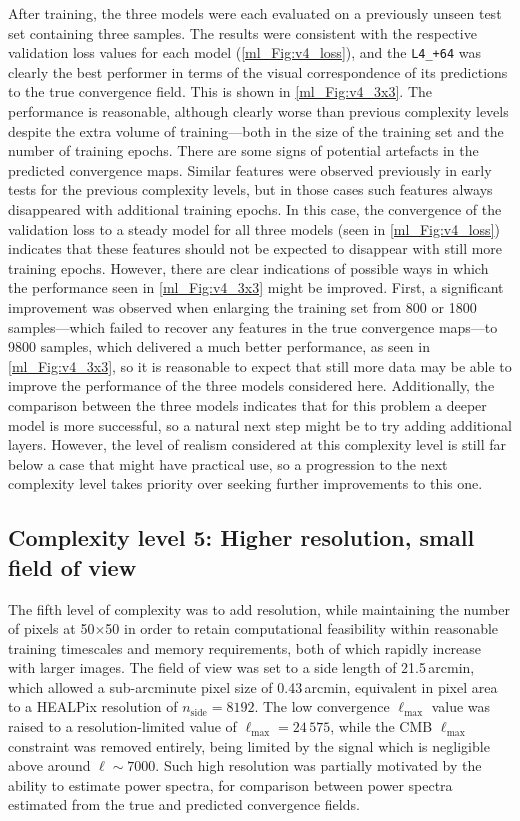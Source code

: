 After training, the three models were each evaluated on a previously unseen test set containing three samples. The results were consistent with the respective validation loss values for each model (\autoref{ml_Fig:v4_loss}), and the \texttt{L4\_+64} was clearly the best performer in terms of the visual correspondence of its predictions to the true convergence field. This is shown in \autoref{ml_Fig:v4_3x3}. The performance is reasonable, although clearly worse than previous complexity levels despite the extra volume of training---both in the size of the training set and the number of training epochs. There are some signs of potential artefacts in the predicted convergence maps. Similar features were observed previously in early tests for the previous complexity levels, but in those cases such features always disappeared with additional training epochs. In this case, the convergence of the validation loss to a steady model for all three models (seen in \autoref{ml_Fig:v4_loss}) indicates that these features should not be expected to disappear with still more training epochs. However, there are clear indications of possible ways in which the performance seen in \autoref{ml_Fig:v4_3x3} might be improved. First, a significant improvement was observed when enlarging the training set from 800 or 1800 samples---which failed to recover any features in the true convergence maps---to 9800 samples, which delivered a much better performance, as seen in \autoref{ml_Fig:v4_3x3}, so it is reasonable to expect that still more data may be able to improve the performance of the three models considered here. Additionally, the comparison between the three models indicates that for this problem a deeper model is more successful, so a natural next step might be to try adding additional layers. However, the level of realism considered at this complexity level is still far below a case that might have practical use, so a progression to the next complexity level takes priority over seeking further improvements to this one.

\subsection{Complexity level 5: Higher resolution, small field of view}
\label{ml_Sec:v5}

The fifth level of complexity was to add resolution, while maintaining the number of pixels at 50$\times$50 in order to retain computational feasibility within reasonable training timescales and memory requirements, both of which rapidly increase with larger images. The field of view was set to a side length of 21.5\,arcmin, which allowed a sub-arcminute pixel size of 0.43\,arcmin, equivalent in pixel area to a HEALPix resolution of $n_\text{side} = 8192$. The low convergence $\ell_\text{max}$ value was raised to a resolution-limited value of $\ell_\text{max} = 24\,575$, while the CMB $\ell_\text{max}$ constraint was removed entirely, being limited by the signal which is negligible above around $\ell \sim 7000$. Such high resolution was partially motivated by the ability to estimate power spectra, for comparison between power spectra estimated from the true and predicted convergence fields.

